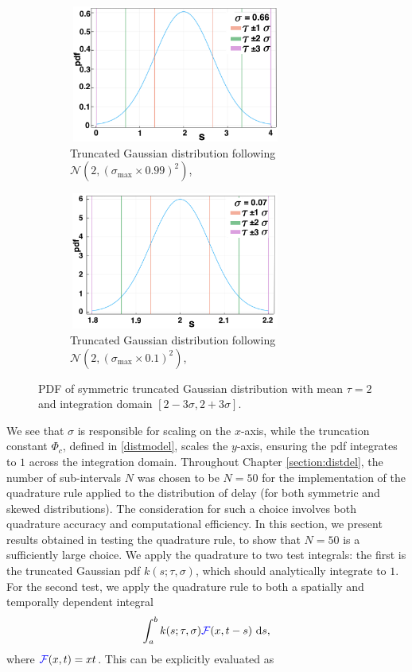 \begin{figure}[H]
    \centering
    \begin{subfigure}[t]{0.45\textwidth}
        \centering
        \includegraphics[width=7cm,height=4.5cm]{t2sig1.png}
        \caption{Truncated Gaussian distribution following $\mathcal{N}(2,(\sigma_{\max}\times0.99)^2)$, }
        \label{}
    \end{subfigure}
    \hfill
    \begin{subfigure}[t]{0.45\textwidth}
        \centering
        \includegraphics[width=7cm,height=4.5cm]{t2sig2.png}
        \caption{Truncated Gaussian distribution following $\mathcal{N}(2,(\sigma_{\max}\times0.1)^2)$, }
        \label{}
    \end{subfigure}
    \caption{PDF of symmetric truncated Gaussian distribution with mean $\tau=2$ and integration domain $[2-3\sigma,2+3\sigma]$. }
    \label{fig:pdf2}
\end{figure}
We see that $\sigma$ is responsible for scaling on the $x$-axis, while the truncation constant $\Phi_c$, defined in \eqref{distmodel}, scales the $y$-axis, ensuring the pdf integrates to $1$ across the integration domain. Throughout Chapter \ref{section:distdel}, the number of sub-intervals $N$ was chosen to be $N=50$ for the implementation of the quadrature rule applied to the distribution of delay (for both symmetric and skewed distributions). The consideration for such a choice involves both quadrature accuracy and computational efficiency. In this section, we present results obtained in testing the quadrature rule, to show that $N=50$ is a sufficiently large choice. We apply the quadrature to two test integrals: the first is the truncated Gaussian pdf $k(s;\tau,\sigma)$, which should analytically integrate to $1$. For the second test, we apply the quadrature rule to both a spatially and temporally dependent integral
\begin{equation}\label{testint}
\int_a^bk(s;\tau,\sigma)\textcolor{blue}{\mathcal{F}}(x,t-s)\ \text{d}s,
\end{equation}
where $\textcolor{blue}{\mathcal{F}}(x,t)=xt$. This can be explicitly evaluated as

